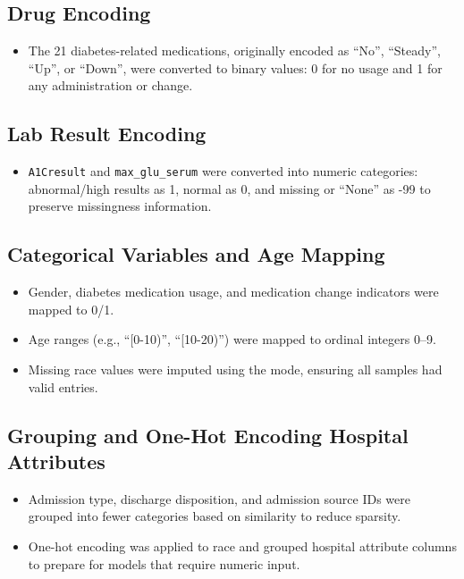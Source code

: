 \documentclass[11pt]{article}
\begin{document}
\subsection{Drug Encoding}
\begin{itemize}
    \item The 21 diabetes-related medications, originally encoded as ``No'', ``Steady'', ``Up'', or ``Down'', were converted to binary values: 0 for no usage and 1 for any administration or change.
\end{itemize}

\subsection{Lab Result Encoding}
\begin{itemize}
    \item \texttt{A1Cresult} and \texttt{max\_glu\_serum} were converted into numeric categories: abnormal/high results as 1, normal as 0, and missing or ``None'' as -99 to preserve missingness information.
\end{itemize}

\subsection{Categorical Variables and Age Mapping}
\begin{itemize}
    \item Gender, diabetes medication usage, and medication change indicators were mapped to 0/1.
    \item Age ranges (e.g., ``[0-10)'', ``[10-20)'') were mapped to ordinal integers 0--9.
    \item Missing race values were imputed using the mode, ensuring all samples had valid entries.
\end{itemize}

\subsection{Grouping and One-Hot Encoding Hospital Attributes}
\begin{itemize}
    \item Admission type, discharge disposition, and admission source IDs were grouped into fewer categories based on similarity to reduce sparsity.
    \item One-hot encoding was applied to race and grouped hospital attribute columns to prepare for models that require numeric input.
\end{itemize}
\end{document}
